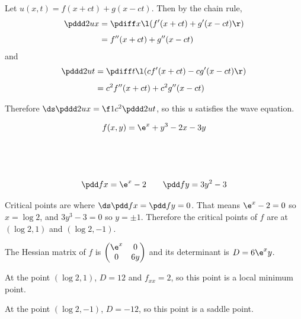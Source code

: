 \documentclass[a4paper]{article}
\begin{document}
Let $u(x, t) = f(x+ct) + g(x-ct)$. Then by the chain rule, \begin{align*}
\pddd 2ux &= \pdiff x \l( f'(x+ct) + g'(x-ct) \r)\\[1ex]
&= f''(x+ct) + g''(x-ct)
\end{align*}
and \begin{align*}
\pddd 2ut &= \pdiff t \l( c f'(x+ct) - c g'(x-ct) \r)\\[1ex]
&= c^2 f''(x+ct) + c^2 g''(x-ct)
\end{align*}

Therefore $\ds \pddd 2ux = \f1{c^2} \pddd 2ut$, so this $u$ satisfies the wave equation.

\newpage


$$f(x, y) = \e^x + y^3 - 2x - 3y$$

\subsection{~}

$$\pdd fx = \e^x - 2 \qquad \pdd fy = 3y^2 - 3$$

Critical points are where $\ds \pdd fx = \pdd fy = 0$. That means $\e^x - 2 = 0$ so $x = \log 2$, and $3y^3 - 3 = 0$ so $y = \pm 1$. Therefore the critical points of $f$ are at $(\log 2, 1)$ and $(\log 2, -1)$.

The Hessian matrix of $f$ is $\begin{pmatrix} \e^x & 0\\ 0 & 6y \end{pmatrix}$ and its determinant is $D = 6 \e^x y$.

At the point $(\log 2, 1)$, $D = 12$ and $f_{xx} = 2$, so this point is a local minimum point.

At the point $(\log 2, -1)$, $D = -12$, so this point is a saddle point.

\subsection{~}
\end{document}
